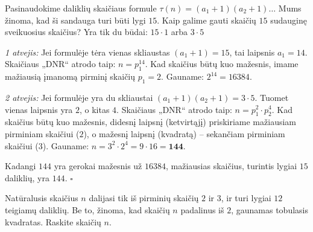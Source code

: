 \documentclass[11pt,a4paper]{scrartcl}
\begin{document}
\begin{solution}

Pasinaudokime daliklių skaičiaus formule $\tau(n) = (a_1 + 1)(a_2 + 1)\dots$
Mums žinoma, kad ši sandauga turi būti lygi $15$. 
Kaip galime gauti skaičių $15$ sudauginę sveikuosius skaičius? Yra tik du būdai:
 $15 \cdot 1$ arba  $3 \cdot 5$

\textit{1 atvejis:} Jei formulėje tėra vienas skliaustas $(a_1 + 1) = 15$, tai laipsnis $a_1 = 14$. 
Skaičiaus „DNR“ atrodo taip: $n = p_1^{14}$.
Kad skaičius būtų kuo mažesnis, imame mažiausią įmanomą pirminį skaičių $p_1 = 2$.
Gauname: $2^{14} = 16384$.

\textit{2 atvejis:} Jei formulėje yra du skliaustai $(a_1 + 1)(a_2 + 1) = 3 \cdot 5$.
Tuomet vienas laipsnis yra $2$, o kitas $4$. 
Skaičiaus „DNR“ atrodo taip: $n = p_1^2 \cdot p_2^4$.
Kad skaičius būtų kuo mažesnis, didesnį laipsnį (ketvirtąjį) priskiriame mažiausiam pirminiam skaičiui ($2$), o mažesnį laipsnį (kvadratą) – sekančiam pirminiam skaičiui ($3$).
Gauname: $n = 3^2 \cdot 2^4 = 9 \cdot 16 = \mathbf{144}$.

Kadangi $144$ yra gerokai mažesnis už $16384$, mažiausias skaičius, turintis lygiai $15$ daliklių, yra $144$. \hfill $\square$
\end{solution}

\begin{example}
Natūralusis skaičius \(n\) dalijasi tik iš pirminių skaičių $2$ ir $3$, ir turi lygiai $12$ teigiamų daliklių. Be to, žinoma, kad skaičių \(n\) padalinus iš $2$, gaunamas tobulasis kvadratas. Raskite skaičių \(n\).
\end{example}
\end{document}
